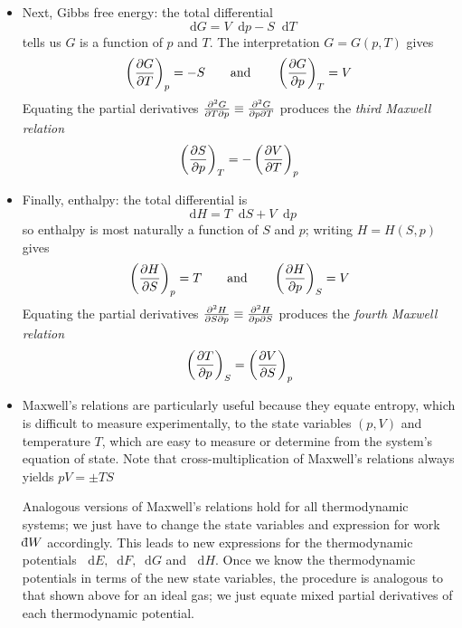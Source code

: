 \documentclass[11pt, a4paper]{article}
\newcommand{\diff}{\mathop{}\!\mathrm{d}} %
\newcommand{\dbar}{{\mathchar '26\mkern -11mu \mathrm{d}}} %
\newcommand{\pdveval}[3]{\left(\pdv{#1}{#2}\right)_{#3}}
\begin{document}
\begin{itemize}
	\item Next, Gibbs free energy: the total differential 
	\begin{equation*}
		\diff G = V\diff p - S \diff T
	\end{equation*}
	tells us $ G $ is a function of $ p $ and $ T $. The interpretation $ G = G(p, T) $ gives
	\begin{equation*}
		\pdveval{G}{T}{p} = - S \qquad \text{and} \qquad \pdveval{G}{p}{T} = V
	\end{equation*}
	Equating the partial derivatives $ \pdv{G}{T}{p} \equiv \pdv{G}{p}{T} $ produces the \textit{third Maxwell relation}
	\begin{equation*}
		\pdveval{S}{p}{T} = -\pdveval{V}{T}{p}
	\end{equation*}
	
	\item Finally, enthalpy: the total differential is
	\begin{equation*}
		\diff H = T \diff S + V \diff p 
	\end{equation*}
	so enthalpy is most naturally a function of $ S $ and $ p $; writing $ H = H(S, p) $ gives
	\begin{equation*}
		\pdveval{H}{S}{p} = T \qquad \text{and} \qquad \pdveval{H}{p}{S} = V
	\end{equation*}
	Equating the partial derivatives $ \pdv{H}{S}{p} \equiv \pdv{H}{p}{S} $ produces the \textit{fourth Maxwell relation}
	\begin{align*}
		\pdveval{T}{p}{S} = \pdveval{V}{S}{p} 
	\end{align*}
	
	\item Maxwell's relations are particularly useful because they equate entropy, which is difficult to measure experimentally, to the  state variables $ (p, V) $ and temperature $ T $, which are easy to measure or determine from the system's equation of state. Note that cross-multiplication of Maxwell's relations always yields $ pV = \pm TS $
	
	Analogous versions of Maxwell's relations hold for all thermodynamic systems; we just have to change the state variables and expression for work $ \dbar W $ accordingly. This leads to new expressions for the thermodynamic potentials $ \diff E, \diff F, \diff G $ and $ \diff H $. Once we know the thermodynamic potentials in terms of the new state variables, the procedure is analogous to that shown above for an ideal gas; we just equate mixed partial derivatives of each thermodynamic potential.
	
\end{itemize}
\end{document}

